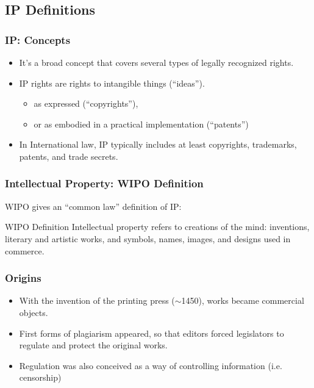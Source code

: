 \documentclass{beamer}
\begin{document}
\subsection{IP Definitions}
\begin{frame}
\frametitle{IP: Concepts}

\begin{itemize}
\item It's a broad concept that covers several types of legally recognized rights.
\item IP rights are rights to \alert{intangible things} (``ideas'').
	\begin{itemize}
   \item as expressed (``copyrights''), 
   \item or as embodied in a practical implementation (``patents'')
	\end{itemize}
\item In International law, IP typically includes at least \alert{copyrights}, \alert{trademarks}, \alert{patents}, and \alert{trade secrets}.

\end{itemize}

\end{frame}



\begin{frame}
\frametitle{Intellectual Property: WIPO Definition}

\textsc{WIPO} gives an ``common law'' definition of IP:

\begin{block}{WIPO Definition}
  Intellectual property refers to creations of the mind:
  inventions, literary and artistic works, and symbols, names, images,
  and designs used in commerce.
\end{block}

\end{frame}


\begin{frame}
\frametitle{Origins}

\begin{itemize}
\item With the invention of the printing press ($\sim$1450), works became commercial objects.
\item First forms of plagiarism appeared, so that editors forced legislators
to regulate and protect the original works.
\item Regulation was also conceived as a way of controlling information (i.e. censorship)
\end{itemize}

\end{frame}
\end{document}
